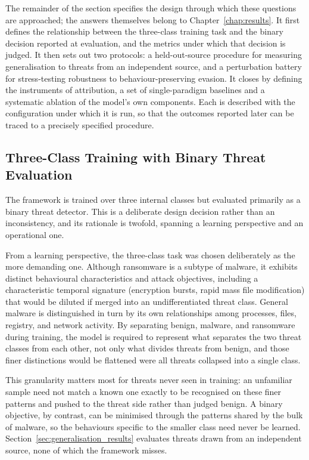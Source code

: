 \documentclass[%
    BCOR=10mm,
    DIV=13,
    toc=bibliography,
    toc=listof,
    oneside,
    12pt,
]{scrbook}
\begin{document}
The remainder of the section specifies the design through which these questions
are approached; the answers themselves belong to Chapter~\ref{chap:results}. It
first defines the relationship between the three-class training task and the
binary decision reported at evaluation, and the metrics under which that
decision is judged. It then sets out two protocols: a held-out-source procedure
for measuring generalisation to threats from an independent source, and a
perturbation battery for stress-testing robustness to behaviour-preserving
evasion. It closes
by defining the instruments of attribution, a set of single-paradigm baselines
and a systematic ablation of the model's own components. Each is described with
the configuration under which it is run, so that the outcomes reported later can
be traced to a precisely specified procedure.

\subsection{Three-Class Training with Binary Threat Evaluation}
\label{subsec:binary_projection}

The framework is trained over three internal classes but evaluated primarily
as a binary threat detector. This is a deliberate design decision rather than
an inconsistency, and its rationale is twofold, spanning a learning perspective
and an operational one.

From a learning perspective, the three-class task was chosen deliberately as
the more demanding one. Although ransomware is a subtype of malware, it
exhibits distinct behavioural characteristics and attack objectives, including
a characteristic temporal signature (encryption bursts, rapid mass file
modification) that would be diluted if merged into an undifferentiated threat
class. General malware is distinguished in turn by its own relationships among
processes, files, registry, and network activity. By separating benign,
malware, and ransomware during training, the model is required to represent
what separates the two threat classes from each other, not only what divides
threats from benign, and those finer distinctions would be flattened were all
threats collapsed into a single class.

This granularity matters most for threats never seen in training: an unfamiliar
sample need not match a known one exactly to be recognised on these finer
patterns and pushed to the threat side rather than judged benign. A binary
objective, by contrast, can be minimised through the patterns shared by the bulk
of malware, so the behaviours specific to the smaller class need never be
learned. Section~\ref{sec:generalisation_results} evaluates threats drawn from
an independent source, none of which the framework misses.
\end{document}
